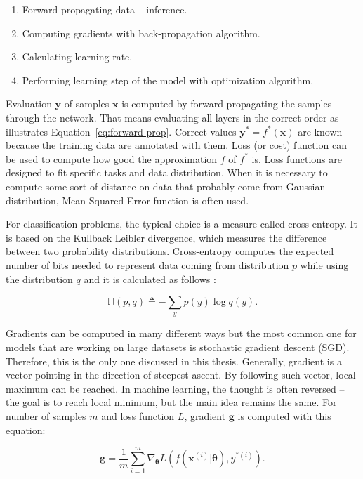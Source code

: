 \begin{enumerate}
    \item Forward propagating data -- inference.
    \item Computing gradients with back-propagation algorithm.
    \item Calculating learning rate.
    \item Performing learning step of the model with optimization algorithm.
\end{enumerate}

Evaluation $\pmb y$ of samples $\pmb x$ is computed by forward propagating the samples through the network. That means evaluating all layers in the correct order as illustrates Equation~\ref{eq:forward-prop}. Correct values $\pmb y^*=f^*(\pmb x)$ are known because the training data are annotated with them. Loss (or cost) function can be used to compute how good the approximation $f$ of $f^*$ is. Loss functions are designed to fit specific tasks and data distribution. When it is necessary to compute some sort of distance on data that probably come from Gaussian distribution, Mean Squared Error function is often used.

For classification problems, the typical choice is a measure called cross-entropy. It is based on the Kullback Leibler divergence, which measures the difference between two probability distributions. Cross-entropy computes the expected number of bits needed to represent data coming from distribution $p$ while using the distribution $q$ and it is calculated as follows \cite{pml1Book}:

\begin{equation}
    \label{eq:cross-entropy}
    \mathbb{H}(p, q) \triangleq -\sum\limits_{y} p(y) \log q(y).
\end{equation}

Gradients can be computed in many different ways but the most common one for models that are working on large datasets is stochastic gradient descent (SGD). Therefore, this is the only one discussed in this thesis. Generally, gradient is a vector pointing in the direction of steepest ascent. By following such vector, local maximum can be reached. In machine learning, the thought is often reversed -- the goal is to reach local minimum, but the main idea remains the same. For number of samples $m$ and loss function $L$, gradient $\pmb g$ is computed with this equation: 

\begin{equation}
    \label{eq:sgd}
    \pmb g = \frac{1}{m} \sum\limits_{i=1}^{m} \nabla_{\pmb \theta} L(f(\pmb {x}^{(i)}| \pmb \theta), {y}^{*(i)}).
\end{equation}

